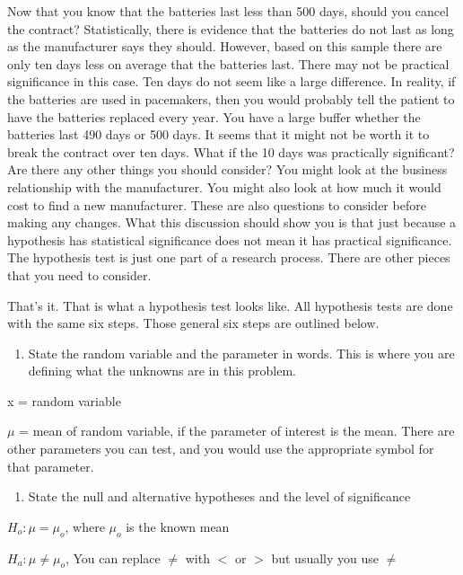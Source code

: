 \documentclass[]{book}
\providecommand{\tightlist}{%
  \setlength{\itemsep}{0pt}\setlength{\parskip}{0pt}}
\begin{document}
Now that you know that the batteries last less than 500 days, should you cancel the contract? Statistically, there is evidence that the batteries do not last as long as the manufacturer says they should. However, based on this sample there are only ten days less on average that the batteries last. There may not be practical significance in this case. Ten days do not seem like a large difference. In reality, if the batteries are used in pacemakers, then you would probably tell the patient to have the batteries replaced every year. You have a large buffer whether the batteries last 490 days or 500 days. It seems that it might not be worth it to break the contract over ten days. What if the 10 days was practically significant? Are there any other things you should consider? You might look at the business relationship with the manufacturer. You might also look at how much it would cost to find a new manufacturer. These are also questions to consider before making any changes. What this discussion should show you is that just because a hypothesis has statistical significance does not mean it has practical significance. The hypothesis test is just one part of a research process. There are other pieces that you need to consider.

That's it. That is what a hypothesis test looks like. All hypothesis tests are done with the same six steps. Those general six steps are outlined below.

\begin{enumerate}
\def\labelenumi{\arabic{enumi}.}
\tightlist
\item
  State the random variable and the parameter in words. This is where
  you are defining what the unknowns are in this problem.
\end{enumerate}

x = random variable

\(\mu\) = mean of random variable, if the parameter of interest is the mean. There are other parameters you can test, and you would use the appropriate symbol for that parameter.

\begin{enumerate}
\def\labelenumi{\arabic{enumi}.}
\setcounter{enumi}{1}
\tightlist
\item
  State the null and alternative hypotheses and the level of
  significance
\end{enumerate}

\(H_o:\mu=\mu_o\), where \(\mu_o\) is the known mean

\(H_a:\mu\ne\mu_o\), You can replace \(\ne\) with \(<\) or \(>\) but usually you use \(\ne\)
\end{document}
